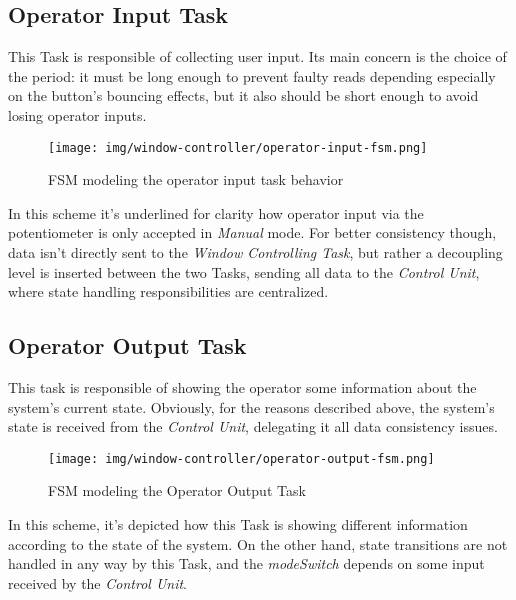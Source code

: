 \documentclass[a4paper,12pt]{report}
\begin{document}
		\subsection{Operator Input Task}
		This Task is responsible of collecting user input. Its main concern is the choice of the period: it must be long enough to prevent faulty reads depending especially on the button's bouncing effects, but it also should be short enough to avoid losing operator inputs.
		\begin{figure}[H]
			\centering{}
			\texttt{[image: img/window-controller/operator-input-fsm.png]}
			\caption{FSM modeling the operator input task behavior}
			\label{img:window-controller/operator-input-fsm}
		\end{figure}
		In this scheme it's underlined for clarity how operator input via the potentiometer is only accepted in \textit{Manual} mode. For better consistency though, data isn't directly sent to the \textit{Window Controlling Task}, but rather a decoupling level is inserted between the two Tasks, sending all data to the \textit{Control Unit}, where state handling responsibilities are centralized.
		\subsection{Operator Output Task}
		This task is responsible of showing the operator some information about the system's current state. Obviously, for the reasons described above, the system's state is received from the \textit{Control Unit}, delegating it all data consistency issues.
		\begin{figure}[H]
			\centering{}
			\texttt{[image: img/window-controller/operator-output-fsm.png]}
			\caption{FSM modeling the Operator Output Task}
			\label{img:window-controller/operator-output-fsm}
		\end{figure}
		In this scheme, it's depicted how this Task is showing different information according to the state of the system. On the other hand, state transitions are not handled in any way by this Task, and the \textit{modeSwitch} depends on some input received by the \textit{Control Unit}.
\end{document}
